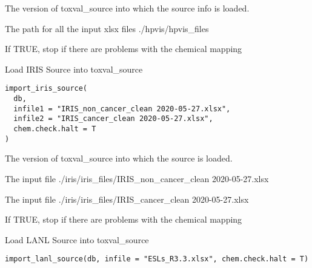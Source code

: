 \documentclass[letterpaper]{book}
\begin{document}
%
\begin{Arguments}
\begin{ldescription}
\item[\code{db}] The version of toxval\_source into which the source info is loaded.

\item[\code{filepath}] The path for all the input xlsx files ./hpvis/hpvis\_files

\item[\code{chem.check.halt}] If TRUE, stop if there are problems with the chemical mapping
\end{ldescription}
\end{Arguments}
%
\begin{Description}\relax
Load IRIS Source into toxval\_source
\end{Description}
%
\begin{Usage}
\begin{verbatim}
import_iris_source(
  db,
  infile1 = "IRIS_non_cancer_clean 2020-05-27.xlsx",
  infile2 = "IRIS_cancer_clean 2020-05-27.xlsx",
  chem.check.halt = T
)
\end{verbatim}
\end{Usage}
%
\begin{Arguments}
\begin{ldescription}
\item[\code{db}] The version of toxval\_source into which the source is loaded.

\item[\code{infile1}] The input file ./iris/iris\_files/IRIS\_non\_cancer\_clean 2020-05-27.xlsx

\item[\code{infile2}] The input file ./iris/iris\_files/IRIS\_cancer\_clean 2020-05-27.xlsx

\item[\code{chem.check.halt}] If TRUE, stop if there are problems with the chemical mapping
\end{ldescription}
\end{Arguments}
%
\begin{Description}\relax
Load LANL Source into toxval\_source
\end{Description}
%
\begin{Usage}
\begin{verbatim}
import_lanl_source(db, infile = "ESLs_R3.3.xlsx", chem.check.halt = T)
\end{verbatim}
\end{Usage}
\end{document}
